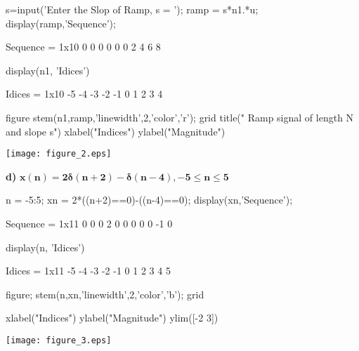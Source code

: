 \documentclass[12pt, onecolumn]{IEEEtran}
\begin{document}
	\begin{matlabcode}
		s=input('Enter the Slop of Ramp, s = ');
		ramp = s*n1.*u;
		display(ramp,'Sequence');
	\end{matlabcode}
	\begin{matlaboutput}
		Sequence = 1x10    
		0     0     0     0     0     0     2     4     6     8
		
	\end{matlaboutput}
	\begin{matlabcode}
		display(n1, 'Idices')
	\end{matlabcode}
	\begin{matlaboutput}
		Idices = 1x10    
		-5    -4    -3    -2    -1     0     1     2     3     4
		
	\end{matlaboutput}
	\begin{matlabcode}
		figure
		stem(n1,ramp,'linewidth',2,'color','r'); grid
		title("  Ramp signal of length N and slope s")
		xlabel("Indices")
		ylabel("Magnitude")
	\end{matlabcode}
	\begin{center}
		\texttt{[image: figure\_2.eps]}
	\end{center}
	
	\begin{par}
		\begin{flushleft}
			\textbf{d)} $\mathbf{x(n)=2\delta (n+2)-\delta(n-4), -5\leq n\leq5}$
		\end{flushleft}
	\end{par}
	
	\begin{matlabcode}
		n = -5:5;
		xn = 2*((n+2)==0)-((n-4)==0); %
		display(xn,'Sequence');
	\end{matlabcode}
	\begin{matlaboutput}
		Sequence = 1x11    
		0     0     0     2     0     0     0     0     0    -1     0
		
	\end{matlaboutput}
	\begin{matlabcode}
		display(n, 'Idices')
	\end{matlabcode}
	\begin{matlaboutput}
		Idices = 1x11    
		-5    -4    -3    -2    -1     0     1     2     3     4     5
		
	\end{matlaboutput}
	\begin{matlabcode}
		figure;
		stem(n,xn,'linewidth',2,'color','b'); grid
		
		xlabel("Indices")
		ylabel("Magnitude")
		ylim([-2 3])
	\end{matlabcode}
	\begin{center}
		\texttt{[image: figure\_3.eps]}
	\end{center}
	
\end{document}
